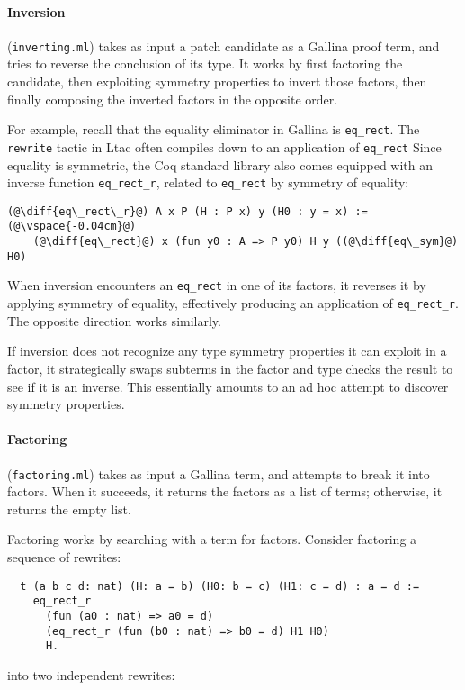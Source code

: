 \paragraph{Inversion}  (\lstinline{inverting.ml}) takes as input a patch candidate as a Gallina proof term,
and tries to reverse the conclusion of its type.
It works by first factoring the candidate,
then exploiting symmetry properties to invert those factors,
then finally composing the inverted factors in the opposite order.

For example, recall that the equality eliminator in Gallina is \lstinline{eq_rect}.
The \lstinline{rewrite} tactic in Ltac often compiles down to an application of \lstinline{eq_rect} %
Since equality is symmetric, the Coq standard library also comes equipped with an inverse function \lstinline{eq_rect_r},
related to \lstinline{eq_rect} by symmetry of equality:

\begin{lstlisting}[language=coq]
  (@\diff{eq\_rect\_r}@) A x P (H : P x) y (H0 : y = x) :=(@\vspace{-0.04cm}@)
    (@\diff{eq\_rect}@) x (fun y0 : A => P y0) H y ((@\diff{eq\_sym}@) H0)	
\end{lstlisting} %
When inversion encounters an \lstinline{eq_rect} in one of its factors,
it reverses it by applying symmetry of equality, effectively producing an application of \lstinline{eq_rect_r}.
The opposite direction works similarly.

If inversion does not recognize any type symmetry properties it can exploit in a factor, it
strategically swaps subterms in the factor and type checks the result to see if it is an inverse.
This essentially amounts to an ad hoc attempt to discover symmetry properties.

\paragraph{Factoring}  (\lstinline{factoring.ml}) takes as input a Gallina term,
and attempts to break it into factors.
When it succeeds, it returns the factors as a list of terms;
otherwise, it returns the empty list.

Factoring works by searching with a term for factors.
Consider factoring a sequence of rewrites:
\begin{lstlisting}
  t (a b c d: nat) (H: a = b) (H0: b = c) (H1: c = d) : a = d :=
    eq_rect_r
      (fun (a0 : nat) => a0 = d)
      (eq_rect_r (fun (b0 : nat) => b0 = d) H1 H0)
      H.
\end{lstlisting}
into two independent rewrites:

